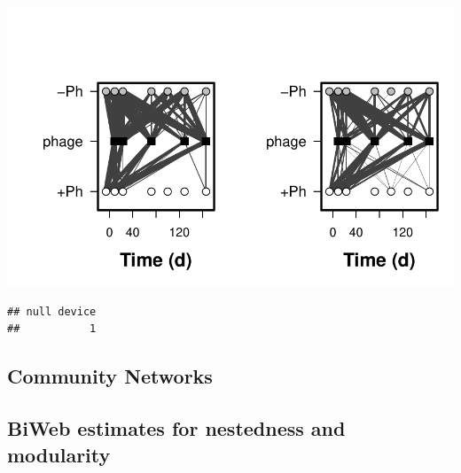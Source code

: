 \documentclass[]{article}
\begin{document}
\includegraphics{analysis_ecoevostoich_files/figure-latex/coevo-pub/fig-1.pdf}

\begin{verbatim}
## null device 
##           1
\end{verbatim}

\newpage

\subsection{Community Networks}\label{community-networks}

\newpage

\subsection{BiWeb estimates for nestedness and
modularity}\label{biweb-estimates-for-nestedness-and-modularity}
\end{document}
